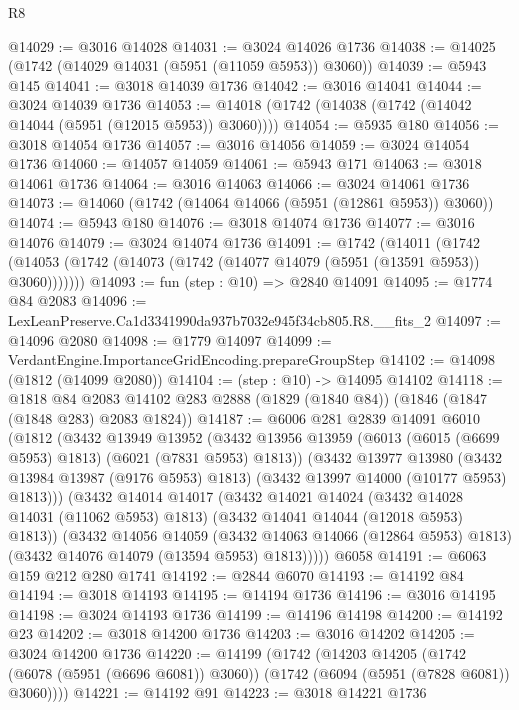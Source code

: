 \begin{lexlean}{R8}
\begin{coremodule}
@14029 := @3016 @14028
@14031 := @3024 @14026 @1736
@14038 := @14025 (@1742 (@14029 @14031 (@5951 (@11059 @5953)) @3060))
@14039 := @5943 @145
@14041 := @3018 @14039 @1736
@14042 := @3016 @14041
@14044 := @3024 @14039 @1736
@14053 := @14018 (@1742 (@14038 (@1742 (@14042 @14044 (@5951 (@12015 @5953)) @3060))))
@14054 := @5935 @180
@14056 := @3018 @14054 @1736
@14057 := @3016 @14056
@14059 := @3024 @14054 @1736
@14060 := @14057 @14059
@14061 := @5943 @171
@14063 := @3018 @14061 @1736
@14064 := @3016 @14063
@14066 := @3024 @14061 @1736
@14073 := @14060 (@1742 (@14064 @14066 (@5951 (@12861 @5953)) @3060))
@14074 := @5943 @180
@14076 := @3018 @14074 @1736
@14077 := @3016 @14076
@14079 := @3024 @14074 @1736
@14091 := @1742
    (@14011 (@1742 (@14053 (@1742 (@14073 (@1742 (@14077 @14079 (@5951 (@13591 @5953)) @3060)))))))
@14093 := fun (step : @10) => @2840 @14091
@14095 := @1774 @84 @2083
@14096 := LexLeanPreserve.Ca1d3341990da937b7032e945f34cb805.R8.__fits_2
@14097 := @14096 @2080
@14098 := @1779 @14097
@14099 := VerdantEngine.ImportanceGridEncoding.prepareGroupStep
@14102 := @14098 (@1812 (@14099 @2080))
@14104 := (step : @10) -> @14095 @14102
@14118 := @1818
    @84
    @2083
    @14102
    @283
    @2888
    (@1829 (@1840 @84))
    (@1846 (@1847 (@1848 @283) @2083 @1824))
@14187 := @6006
    @281
    @2839
    @14091
    @6010
    (@1812
      (@3432
        @13949
        @13952
        (@3432
          @13956
          @13959
          (@6013 (@6015 (@6699 @5953) @1813) (@6021 (@7831 @5953) @1813))
          (@3432
            @13977
            @13980
            (@3432 @13984 @13987 (@9176 @5953) @1813)
            (@3432 @13997 @14000 (@10177 @5953) @1813)))
        (@3432
          @14014
          @14017
          (@3432
            @14021
            @14024
            (@3432 @14028 @14031 (@11062 @5953) @1813)
            (@3432 @14041 @14044 (@12018 @5953) @1813))
          (@3432
            @14056
            @14059
            (@3432 @14063 @14066 (@12864 @5953) @1813)
            (@3432 @14076 @14079 (@13594 @5953) @1813)))))
    @6058
@14191 := @6063 @159 @212 @280 @1741
@14192 := @2844 @6070
@14193 := @14192 @84
@14194 := @3018 @14193
@14195 := @14194 @1736
@14196 := @3016 @14195
@14198 := @3024 @14193 @1736
@14199 := @14196 @14198
@14200 := @14192 @23
@14202 := @3018 @14200 @1736
@14203 := @3016 @14202
@14205 := @3024 @14200 @1736
@14220 := @14199
    (@1742
      (@14203
        @14205
        (@1742 (@6078 (@5951 (@6696 @6081)) @3060))
        (@1742 (@6094 (@5951 (@7828 @6081)) @3060))))
@14221 := @14192 @91
@14223 := @3018 @14221 @1736

\end{coremodule}
\end{lexlean}
